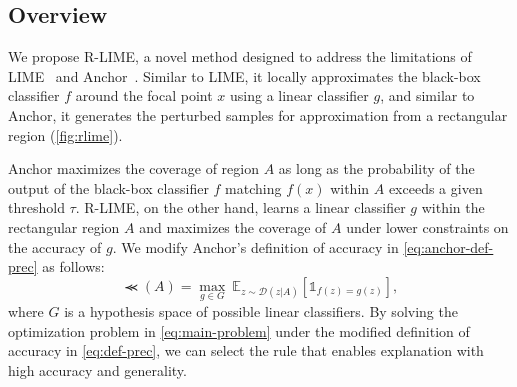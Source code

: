\documentclass[runningheads]{llncs}
\begin{document}
\subsection{Overview}
We propose R-LIME,
a novel method designed to address the limitations of LIME~\cite{ribeiro2016why}
and Anchor~\cite{ribeiro2018anchors}.
Similar to LIME,
it locally approximates the black-box classifier $f$
around the focal point $x$ using a linear classifier $g$,
and similar to Anchor,
it generates the perturbed samples for approximation
from a rectangular region (\cref{fig:rlime}).

Anchor maximizes the coverage of region $A$
as long as the probability of the output of the black-box classifier $f$ matching $f(x)$
within $A$ exceeds a given threshold $\tau$.
R-LIME, on the other hand, learns a linear classifier $g$
within the rectangular region $A$ and maximizes the coverage of $A$
under lower constraints on the accuracy of $g$.
We modify Anchor's definition of accuracy in \cref{eq:anchor-def-prec}
as follows:
\begin{equation}
  \Prec(A)=\underset{g\in G}{\max}\ \mathbb{E}_{z\sim\mathcal{D}(z|A)}
  [\mathds{1}_{f(z)=g(z)}], \label{eq:def-prec}
\end{equation}
where $G$ is a hypothesis space of possible linear classifiers.
By solving the optimization problem in \cref{eq:main-problem}
under the modified definition of accuracy in \cref{eq:def-prec},
we can select the rule that enables explanation with high accuracy and generality.
\end{document}
